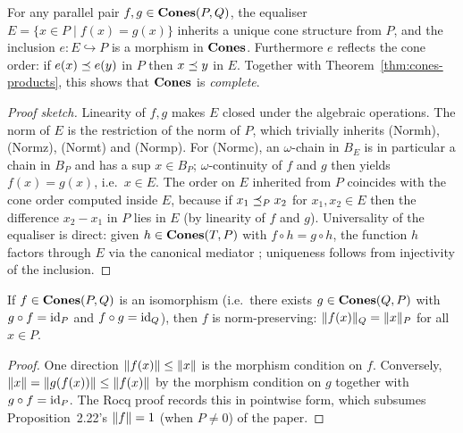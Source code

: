 \begin{theorem}
\label{thm:cones-equalisers}
\rocqok{}
For any parallel pair $f, g \in \mathbf{Cones}(P, Q)$, the equaliser
$E = \{x \in P \mid f(x) = g(x)\}$ inherits a unique cone structure
from $P$, and the inclusion $e : E \hookrightarrow P$ is a
morphism in $\mathbf{Cones}$. Furthermore $e$ reflects the cone order: if
$e(x) \preceq e(y)$ in $P$ then $x \preceq y$ in $E$. Together with
Theorem~\ref{thm:cones-products}, this shows that $\mathbf{Cones}$ is
\emph{complete}.
\end{theorem}

\begin{proof}[Proof sketch]
Linearity of $f, g$ makes $E$ closed under the algebraic
operations. The norm of $E$ is the restriction of the norm of $P$,
which trivially inherits (Normh), (Normz), (Normt) and (Normp).
For (Normc), an $\omega$-chain in $B_E$ is in particular a chain
in $B_P$ and has a sup $x \in B_P$; $\omega$-continuity of $f$
and $g$ then yields $f(x) = g(x)$, i.e.\ $x \in E$. The order on
$E$ inherited from $P$ coincides with the cone order computed
inside $E$, because if $x_1 \preceq_P x_2$ for $x_1, x_2 \in E$
then the difference $x_2 - x_1$ in $P$ lies in $E$ (by linearity
of $f$ and $g$). Universality of the equaliser is direct: given
$h \in \mathbf{Cones}(T, P)$ with $f \circ h = g \circ h$, the function
$h$ factors through $E$ via the canonical mediator
; uniqueness follows
from injectivity of the inclusion.
\end{proof}

\begin{lemma}
\label{lem:iso-preserves-norm}
\rocqok{}
If $f \in \mathbf{Cones}(P, Q)$ is an isomorphism (i.e.\ there exists
$g \in \mathbf{Cones}(Q, P)$ with $g \circ f = \mathrm{id}_P$ and $f \circ g =
\mathrm{id}_Q$), then $f$ is norm-preserving: $\lVert f(x) \rVert_Q = \lVert x \rVert_P$
for all $x \in P$.
\end{lemma}

\begin{proof}
One direction $\lVert f(x) \rVert \leq \lVert x \rVert$ is the morphism
condition on $f$. Conversely, $\lVert x \rVert = \lVert g(f(x)) \rVert \leq
\lVert f(x) \rVert$ by the morphism condition on $g$ together with
$g \circ f = \mathrm{id}_P$. The Rocq proof
 records
this in pointwise form, which subsumes Proposition~2.22's
$\lVert f \rVert = 1$ (when $P \neq 0$) of the paper.
\end{proof}

